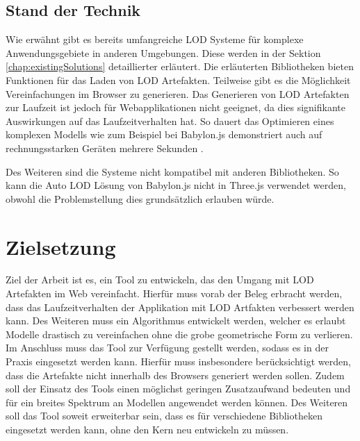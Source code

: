 \subsection{Stand der Technik}

Wie erwähnt gibt es bereits umfangreiche LOD Systeme für komplexe Anwendungsgebiete in anderen Umgebungen. Diese werden in der Sektion \autoref{chap:existingSolutions} detaillierter erläutert.
Die erläuterten Bibliotheken bieten Funktionen für das Laden von LOD Artefakten. Teilweise gibt es die Möglichkeit Vereinfachungen im Browser zu generieren. Das Generieren von LOD Artefakten zur Laufzeit ist jedoch für Webapplikationen nicht geeignet, da dies signifikante Auswirkungen auf das Laufzeitverhalten hat.
So dauert das Optimieren eines komplexen Modells wie zum Beispiel bei Babylon.js demonstriert auch auf rechnungsstarken Geräten mehrere Sekunden \cite{babylonAutoLod}.

Des Weiteren sind die Systeme nicht kompatibel mit anderen Bibliotheken. So kann die Auto LOD Lösung von Babylon.js nicht in Three.js verwendet werden, obwohl die Problemstellung dies grundsätzlich erlauben würde.

\section{Zielsetzung}
Ziel der Arbeit ist es, ein Tool zu entwickeln, das den Umgang mit LOD Artefakten im Web vereinfacht. Hierfür muss vorab der Beleg erbracht werden, dass das Laufzeitverhalten der Applikation mit LOD Artfakten verbessert werden kann. Des Weiteren muss ein Algorithmus entwickelt werden, welcher es erlaubt Modelle drastisch zu vereinfachen ohne die grobe geometrische Form zu verlieren. Im Anschluss muss das Tool zur Verfügung gestellt werden, sodass es in der Praxis eingesetzt werden kann. Hierfür muss insbesondere berücksichtigt werden, dass die Artefakte nicht innerhalb des Browsers generiert werden sollen. Zudem soll der Einsatz des Tools einen möglichst geringen Zusatzaufwand bedeuten und für ein breites Spektrum an Modellen angewendet werden können. Des Weiteren soll das Tool soweit erweiterbar sein, dass es für verschiedene Bibliotheken eingesetzt werden kann, ohne den Kern neu entwickeln zu müssen.
